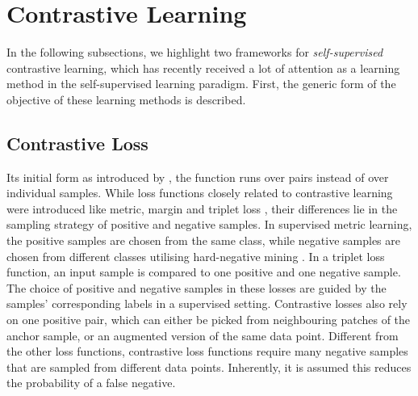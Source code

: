 \section{Contrastive Learning}
In the following subsections, we highlight two frameworks for \textit{self-supervised} contrastive learning, which has recently received a lot of attention as a learning method in the self-supervised learning paradigm. First, the generic form of the objective of these learning methods is described.


\subsection{Contrastive Loss}
Its initial form as introduced by \cite{contrastiveloss}, the function runs over pairs instead of over individual samples. While loss functions closely related to contrastive learning were introduced like metric, margin and triplet loss \cite{8014803, marginloss, chechik_large_2009}, their differences lie in the sampling strategy of positive and negative samples. In supervised metric learning, the positive samples are chosen from the same class, while negative samples are chosen from different classes utilising hard-negative mining \cite{8014803}. In a triplet loss function, an input sample is compared to one positive and one negative sample. The choice of positive and negative samples in these losses are guided by the samples' corresponding labels in a supervised setting. Contrastive losses also rely on one positive pair, which can either be picked from neighbouring patches of the anchor sample, or an augmented version of the same data point. Different from the other loss functions, contrastive loss functions require many negative samples that are sampled from different data points. Inherently, it is assumed this reduces the probability of a false negative.





